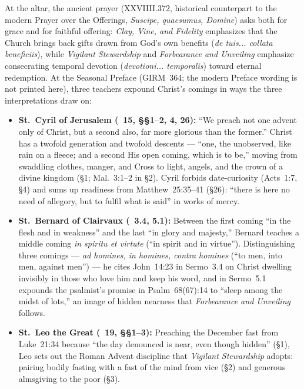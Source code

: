 At the altar, the ancient  prayer (XXVIIII.372, historical counterpart to the modern Prayer over the Offerings, \emph{Suscipe, quaesumus, Domine}) asks both for grace and for faithful offering: \emph{Clay, Vine, and Fidelity} emphasizes that the Church brings back gifts drawn from God's own benefits (\emph{de tuis... collata beneficiis}), while \emph{Vigilant Stewardship} and \emph{Forbearance and Unveiling} emphasize consecrating temporal devotion (\emph{devotioni... temporalis}) toward eternal redemption. At the Seasonal Preface (GIRM~364; the modern Preface wording is not printed here), three teachers expound Christ's comings in ways the three interpretations draw on:
\begin{itemize}[leftmargin=1.5em,itemsep=0.2em]
\item \textbf{St.~Cyril of Jerusalem (~15, §§1--2, 4, 26):} ``We preach not one advent only of Christ, but a second also, far more glorious than the former.'' Christ has a twofold generation and twofold descents --- ``one, the unobserved, like rain on a fleece; and a second His open coming, which is to be,'' moving from swaddling clothes, manger, and Cross to light, angels, and the crown of a divine kingdom (§1; Mal.~3:1--2 in §2). Cyril forbids date-curiosity (Acts~1:7, §4) and sums up readiness from Matthew~25:35--41 (§26): ``there is here no need of allegory, but to fulfil what is said'' in works of mercy.
\item \textbf{St.~Bernard of Clairvaux (~3.4, 5.1):} Between the first coming ``in the flesh and in weakness'' and the last ``in glory and majesty,'' Bernard teaches a middle coming \emph{in spiritu et virtute} (``in spirit and in virtue''). Distinguishing three comings --- \emph{ad homines, in homines, contra homines} (``to men, into men, against men'') --- he cites John~14:23 in Sermo~3.4 on Christ dwelling invisibly in those who love him and keep his word, and in Sermo~5.1 expounds the psalmist's promise in Psalm~68(67):14 to ``sleep among the midst of lots,'' an image of hidden nearness that \emph{Forbearance and Unveiling} follows.
\item \textbf{St.~Leo the Great (~19, §§1--3):} Preaching the December fast from Luke~21:34 because ``the day denounced is near, even though hidden'' (§1), Leo sets out the Roman Advent discipline that \emph{Vigilant Stewardship} adopts: pairing bodily fasting with a fast of the mind from vice (§2) and generous almsgiving to the poor (§3).
\end{itemize}

